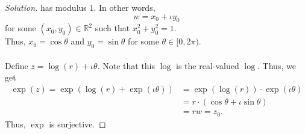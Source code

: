 \documentclass[12pt]{article}
\theoremstyle{definition}
\numberwithin{thm}{section}
\newenvironment{soln}{\begin{proof}[Solution]}{\end{proof}}
\begin{document}
\begin{enumerate}
\begin{soln}
		has modulus $1.$ In other words,
		\begin{equation*} 
			w = x_0 + \iota y_0
		\end{equation*}
		for some $(x_0, y_0) \in \mathbb{R}^2$ such that $x_0^2 + y_0^2 = 1.$\\
		Thus, $x_0 = \cos\theta$ and $y_0 = \sin\theta$ for some $\theta \in [0, 2\pi).$\\~\\
		Define $z = \log(r) + \iota\theta.$ Note that this $\log$ is the real-valued $\log.$ Thus, we get
		\begin{align*} 
			\exp(z) = \exp(\log(r) + \exp(\iota\theta)) &= \exp(\log(r))\cdot\exp(\iota\theta)\\
			&= r\cdot(\cos\theta + \iota\sin\theta)\\
			&= rw = z_0.
		\end{align*}
		Thus, $\exp$ is surjective.
	\end{soln}


\end{enumerate}
\end{document}
